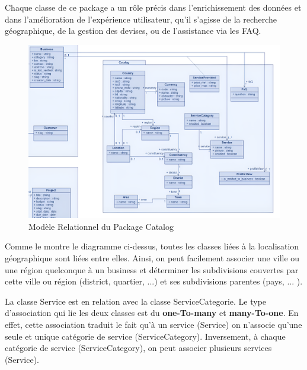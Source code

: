     \vspace{0.35cm}

Chaque classe de ce package a un rôle précis dans l'enrichissement des données et dans l'amélioration de l'expérience utilisateur, qu'il s'agisse de la recherche géographique, de la gestion des devises, ou de l'assistance via les FAQ. 

    \vspace{0.35cm}

\begin{figure}[H]
\begin{center}
\includegraphics[width=15cm]{assets/diagrams/CatalogUC1.png}
\end{center}
\caption{Modèle Relationnel du Package Catalog}
\end{figure}
\vspace{0.35cm}

Comme le montre le diagramme ci-dessus, toutes les classes liées à la localisation géographique sont liées entre elles. Ainsi, on peut facilement associer une ville ou une région quelconque à un business et déterminer les subdivisions couvertes par cette ville ou région (district, quartier, ...) et ses subdivisions parentes (pays, ... ).

\vspace{0.35cm}

La classe Service est en relation avec la classe ServiceCategorie. Le type d'association qui lie les deux classes est du \textbf{one-To-many} et \textbf{many-To-one}. En effet, cette association traduit le fait qu'à un service (Service) on n'associe qu'une seule et unique catégorie de service (ServiceCategory). Inversement, à chaque catégorie de service (ServiceCategory), on peut associer plusieurs services (Service). 

